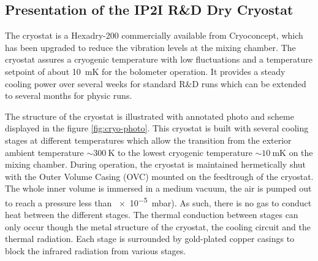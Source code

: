 \subsection{Presentation of the IP2I R\&D Dry Cryostat}

The cryostat is a Hexadry-200 commercially available from Cryoconcept, which has been upgraded to reduce the vibration levels at the mixing chamber.
The cryostat assures a cryogenic temperature with low fluctuations and a temperature setpoint of about \SI{10}{\milli\kelvin} for the bolometer operation. It provides a steady cooling power over several weeks for standard R\&D runs which can be extended to several months for physic runs.

The structure of the cryostat is illustrated with annotated photo and scheme displayed in the figure \ref{fig:cryo-photo}. This cryostat is built with several cooling stages at different temperatures which allow the transition from the exterior ambient temperature $\sim \SI{300}{\kelvin}$ to the lowest cryogenic temperature $\sim \SI{10}{\milli\kelvin}$ on the mixing chamber. During operation, the cryostat is maintained hermetically shut with the Outer Volume Casing (OVC) mounted on the feedtrough of the cryostat. The whole inner volume is immersed in a medium vacuum, the air is pumped out to reach a pressure less than \SI{e-5}{\milli\bar}). As such, there is no gas to conduct heat between the different stages. The thermal conduction between stages can only occur though the metal structure of the cryostat, the cooling circuit and the thermal radiation. Each stage is surrounded by gold-plated copper casings to block the infrared radiation from various stages.

